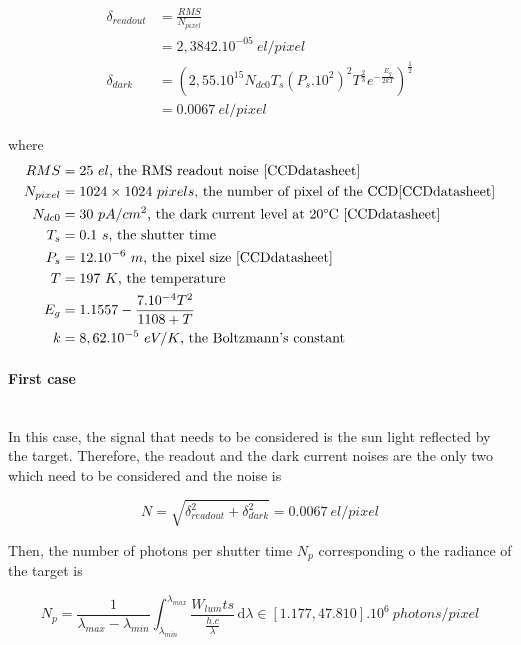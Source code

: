 \begin{align}
\delta_{readout} & = \frac{RMS}{N_{pixel}} \\
& = 2,3842.10^{-05} \ el/pixel \label{eq:readout} \\
\delta_{dark} & = \left(2,55.10^{15}N_{dc0}T_s(P_s.10^2)^2T^{\frac{2}{3}}e^{-\frac{E_g}{2kT}}\right)^{\frac{1}{2}} \\
& = 0.0067 \ el/pixel \label{eq:darkcurrent}
\end{align}

where
\begin{align*}
RMS & = 25\ el\mbox{, the RMS readout noise \ref{CCDdatasheet}}\\
N_{pixel} & = 1024\times 1024 \ pixels\mbox{, the number of pixel of the CCD\ref{CCDdatasheet}}\\
N_{dc0} & = 30\ pA/cm^2\mbox{, the dark current level at 20\textdegree C \ref{CCDdatasheet}}\\
T_s & = 0.1\ s\mbox{, the shutter time}\\
P_s & = 12.10^{-6}\ m\mbox{, the  pixel size \ref{CCDdatasheet}}\\
T & = 197\ K\mbox{, the temperature}\\
E_g & = 1.1557-\frac{7.10^{-4}T^2}{1108+T}\\
k & = 8,62.10^{-5}\ eV/K\mbox{, the Boltzmann's constant}
\end{align*}


\paragraph*{First case}
\label{first case}
~~\\
In this case, the signal that needs to be considered is the sun light reflected by the target. Therefore, the readout and the dark current noises are the only two which need to be considered and the noise is

\begin{equation}
\label{eq:Noise case1}
N = \sqrt{\delta_{readout}^2+\delta_{dark}^2} = 0.0067\ el/pixel
\end{equation}

Then, the number of photons per shutter time $N_p$ corresponding o the radiance of the target is

\begin{equation}
\label{eq:Number Photons per Shutter Time case1}
N_p = \frac{1}{\lambda_{max}-\lambda_{min}}\int_{\lambda_{min}}^{\lambda_{max}} \frac{W_{lum}ts}{\frac{h.c}{\lambda}} \, \mathrm d\lambda \in [1.177, 47.810].10^{6} \ photons/pixel
\end{equation}

